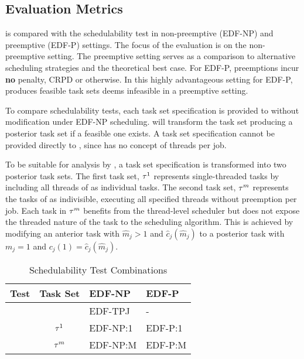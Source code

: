 \subsection{Evaluation Metrics}

\tpj{} is compared with the \npchunks{} schedulability test in
non-preemptive (EDF-NP) and preemptive (EDF-P) settings. The focus of
the evaluation is on the non-preemptive setting. The preemptive
setting serves as a comparison to alternative scheduling strategies
and the theoretical best case. For EDF-P, preemptions incur
\textbf{no} penalty, CRPD or otherwise. In this highly advantageous
setting for EDF-P, \tpj{} produces feasible task sets \npchunks{}
deems infeasible in a preemptive setting.

To compare schedulability tests, each task set specification \ants{}
is provided to \tpj{} without modification under EDF-NP
scheduling. \tpj{} will transform the task set producing a
posterior task set \tasks{} if a feasible one exists. A task set
specification \ants{} cannot be provided directly to \npchunks{},
since \npchunks{} has no concept of threads per job. 

To be suitable for analysis by \npchunks{}, a task set specification
\ants{} is transformed into two posterior task sets. The first task
set, ${\tau{}^1}$ represents single-threaded tasks by including all
threads of \ants{} as individual tasks. The second task set,
${\tau{}^m}$ represents the tasks of \ants{} as indivisible,
executing all specified threads without preemption per job. Each task
in ${\tau{}^m}$ benefits from the  thread-level scheduler but does
not expose the threaded nature of the task to the scheduling
algorithm. This is achieved by modifying an anterior task  with
${\hat{m}_j > 1}$ and ${\hat{c}_j(\hat{m}_j)}$ to a posterior task
 with ${m_j = 1}$ and ${c_j(1) = \hat{c}_j(\hat{m}_j)}$. 

\begin{wraptable}[7]{l}{.55\linewidth}
  \center
  \begin{tabular}{|c|c|l|l|}
    \hline
    \textbf{Test} & \textbf{Task Set} & \textbf{EDF-NP} & \textbf{EDF-P} \\
    \hline
    \hline
    \tpj{} & \ants{} & EDF-TPJ & - \\
    \hline
    \multirow{2}{*}{\npchunks{}}
    & ${\tau{}^1}$ & EDF-NP:1 & EDF-P:1 \\
    & ${\tau{}^m}$ & EDF-NP:M & EDF-P:M \\
    \hline
  \end{tabular}
  \caption{Schedulability Test Combinations}
  \label{table:combinations}
\end{wraptable}


